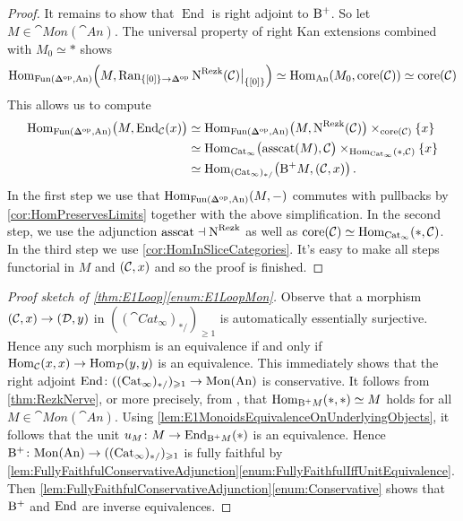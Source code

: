 \begin{proof}
	It remains to show that $\operatorname{End}$ is right adjoint to $\mathrm{B}^+$. So let $M\in\cat{Mon}(\cat{An})$. The universal property of right Kan extensions combined with $M_0\simeq *$ shows 
	\begin{equation*}
		\Hom_{\Fun(\IDelta^\op,\cat{An})}\left(M,\Ran_{\{[0]\}\rightarrow \IDelta^\op}\N^\mathrm{Rezk}(\Cc)\big|_{\{[0]\}}\right)\simeq \Hom_{\cat{An}}(M_0,\core (\Cc))\simeq \core (\Cc)
	\end{equation*}
	This allows us to compute
	\begin{align*}
		\Hom_{\Fun(\IDelta^\op,\cat{An})}\bigl(M,\operatorname{End}_\Cc(x)\bigr)&\simeq \Hom_{\Fun(\IDelta^\op,\cat{An})}\bigl(M,\N^\mathrm{Rezk}(\Cc)\bigr)\times_{\core(\Cc)}\{x\}\\
		&\simeq \Hom_{\cat{Cat}_\infty}\bigl(\operatorname{asscat}(M),\Cc\bigr)\times_{\Hom_{\cat{Cat}_\infty}(*,\Cc)}\{x\}\\
		&\simeq \Hom_{(\cat{Cat}_\infty)_{*/}}\bigl(\B^+M,(\Cc,x)\bigr)\,.
	\end{align*}
	In the first step we use that $\Hom_{\Fun(\IDelta^\op,\cat{An})}(M,-)$ commutes with pullbacks by \cref{cor:HomPreservesLimits} together with the above simplification. In the second step, we use the adjunction $\operatorname{asscat}\dashv \operatorname{N}^\mathrm{Rezk}$ as well as $\operatorname{core}(\mathcal{C})\simeq \operatorname{Hom}_{\mathrm{Cat}_\infty}(*,\mathcal{C})$. In the third step we use \cref{cor:HomInSliceCategories}. It's easy to make all steps functorial in $M$ and $(\mathcal{C},x)$ and so the proof is finished.
\end{proof}
\begin{proof}[Proof sketch of \cref{thm:E1Loop}\cref{enum:E1LoopMon}]
	Observe that a morphism $(\mathcal{C},x)\rightarrow (\mathcal{D},y)$ in $((\cat{Cat}_\infty)_{*/})_{\geqslant 1}$ is automatically essentially surjective. Hence any such morphism is an equivalence if and only if $\operatorname{Hom}_{\mathcal{C}}(x,x)\rightarrow \operatorname{Hom}_{\mathcal{D}}(y,y)$ is an equivalence. This immediately shows that the right adjoint $\operatorname{End}\colon ((\mathrm{Cat}_\infty)_{*/})_{\geqslant 1}\rightarrow \mathrm{Mon}(\mathrm{An})$ is conservative. It follows from \cref{thm:RezkNerve}, or more precisely, from \cite[Corollary~\href{https://arxiv.org/pdf/2312.09889\#equation.3.15}{3.15}]{FabianRezkNerve}, that $\operatorname{Hom}_{\mathrm{B}^+M}(*,*)\simeq M$ holds for all $M\in \cat{Mon}(\cat{An})$. Using \cref{lem:E1MonoidsEquivalenceOnUnderlyingObjects}, it follows that the unit $u_M\colon M\rightarrow \operatorname{End}_{\mathrm{B}^+M}(*)$ is an equivalence. Hence $\mathrm{B}^+\colon \mathrm{Mon}(\mathrm{An})\rightarrow ((\mathrm{Cat}_\infty)_{*/})_{\geqslant 1}$ is fully faithful by \cref{lem:FullyFaithfulConservativeAdjunction}\cref{enum:FullyFaithfulIffUnitEquivalence}. Then \cref{lem:FullyFaithfulConservativeAdjunction}\cref{enum:Conservative} shows that $\mathrm{B}^+$ and $\operatorname{End}$ are inverse equivalences.
\end{proof}



